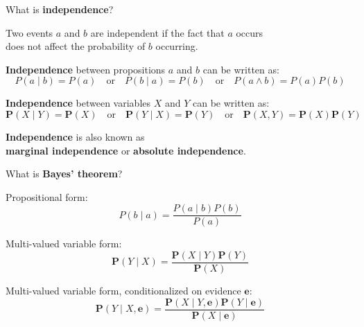 \begin{flashcard}[Question]{What is \textbf{independence}?}
\begin{center}

Two events $a$ and $b$ are independent if the fact that $a$ occurs\\does not affect the probability of $b$ occurring.\\

\medskip

\textbf{Independence} between propositions $a$ and $b$ can be written as:
\begin{displaymath}
P(a \mid b) = P(a) \quad \text{or} \quad P(b \mid a) = P(b) \quad \text{or} \quad P(a \land b) = P(a) P(b)
\end{displaymath}

\medskip

\textbf{Independence} between variables $X$ and $Y$ can be written as:
\begin{displaymath}
\mathbf{P}(X \mid Y) = \mathbf{P}(X) \quad \text{or} \quad \mathbf{P}(Y \mid X) = \mathbf{P}(Y) \quad \text{or} \quad \mathbf{P}(X, Y) = \mathbf{P}(X)\mathbf{P}(Y)
\end{displaymath}

\textbf{Independence} is also known as\\\textbf{marginal independence} or \textbf{absolute independence}.

\end{center}
\end{flashcard}

\begin{flashcard}[Question]{What is \textbf{Bayes' theorem}?}
\begin{center}

Propositional form:
\begin{displaymath}
P(b \mid a) = \frac{P(a \mid b) P(b)}{P(a)}
\end{displaymath}

Multi-valued variable form:
\begin{displaymath}
\mathbf{P}(Y \mid X) = \frac{\mathbf{P}(X \mid Y) \mathbf{P}(Y)}{\mathbf{P}(X)}
\end{displaymath}

Multi-valued variable form, conditionalized on evidence $\mathbf{e}$:
\begin{displaymath}
\mathbf{P}(Y \mid X, \mathbf{e}) = \frac{\mathbf{P}(X \mid Y, \mathbf{e}) \mathbf{P}(Y \mid \mathbf{e})}{\mathbf{P}(X \mid \mathbf{e})}
\end{displaymath}

\end{center}
\end{flashcard}


